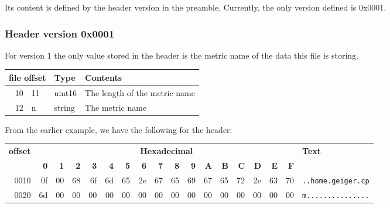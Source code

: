 Its content is defined by the header version in the preamble.
Currently, the only version defined is 0x0001.

\subsubsection{Header version 0x0001}
\label{subsubsec:database:header:0001}

For version 1 the only value stored in the header is the metric name of the data this file is storing.
\begin{table}[ht]
    \begin{tabular}{r l l l}
        \multicolumn{2}{c}{\textbf{file offset}} & \textbf{Type} & \textbf{Contents} \\
        \hline
        10 & 11 & uint16 & The length of the metric name \\
        12 & n & string & The metric name \\
        \hline
    \end{tabular}
\end{table}

From the earlier example, we have the following for the header:
\begin{table}[h*)]
    \begin{tabular}{r|rrrrrrrrrrrrrrrr|l}
        \hline
        \multirow{2}{*}{\textbf{offset}}& \multicolumn{16}{c|}{\textbf{Hexadecimal}} & \multirow{2}{*}{\textbf{Text}} \\
        &  \textbf{0}&\textbf{1}&\textbf{2}&\textbf{3}&
        \textbf{4}&\textbf{5}&\textbf{6}&\textbf{7}&
        \textbf{8}&\textbf{9}&\textbf{A}&\textbf{B}&
        \textbf{C}&\textbf{D}&\textbf{E}&\textbf{F}& \\
        \hline
        0010 & \cellcolor{green!25}0f & \multicolumn{1}{r|}{\cellcolor{green!25}00} &
        \cellcolor{yellow}68 & \cellcolor{yellow}6f & \cellcolor{yellow}6d & \cellcolor{yellow}65 &
        \cellcolor{yellow}2e & \cellcolor{yellow}67 & \cellcolor{yellow}65 & \cellcolor{yellow}69 &
        \cellcolor{yellow}67 & \cellcolor{yellow}65 & \cellcolor{yellow}72 & \cellcolor{yellow}2e & \cellcolor{yellow}63 & \cellcolor{yellow}70 &
        \texttt{..home.geiger.cp}\\
        \cline{2-17}
        0020 &
        \multicolumn{1}{r|}{\cellcolor{yellow}6d} &
        00 & 00 & 00 & 00 & 00 & 00 & 00 & 00 & 00 & 00 & 00 & 00 & 00 & 00 & 00 & \texttt{m...............}\\
        \hline
    \end{tabular}
\end{table}

